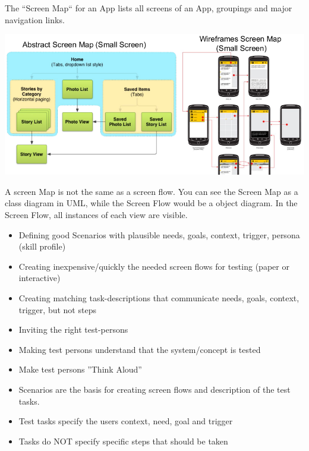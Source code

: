 \columnbreak
\begin{breakbox}

The ``Screen Map`` for an App lists all screens of an App, groupings and
major navigation links.

\includegraphics[width=.25\textwidth]{figures/screenMap.png}

A screen Map is not the same as a screen flow. You can see the
Screen Map as a class diagram in UML, while the Screen Flow would be a
object diagram. In the Screen Flow, all instances of each view are
visible.

\end{breakbox}

\begin{breakbox}

\begin{itemize}
\tightlist
\item
  Defining good Scenarios with plausible needs, goals, context, trigger,
  persona (skill profile)
\item
  Creating inexpensive/quickly the needed screen flows for testing
  (paper or interactive)
\item
  Creating matching task-descriptions that communicate needs, goals,
  context, trigger, but not steps
\item
  Inviting the right test-persons
\item
  Making test persons understand that the system/concept is tested
\item
  Make test persons ''Think Aloud''
\end{itemize}

\end{breakbox}

\begin{breakbox}

\begin{itemize}
    \item Scenarios are the basis for creating screen flows and description of the test tasks.
    \item Test tasks specify the users context, need, goal and trigger
    \item Tasks do NOT specify specific steps that should be taken
\end{itemize}

\end{breakbox}

